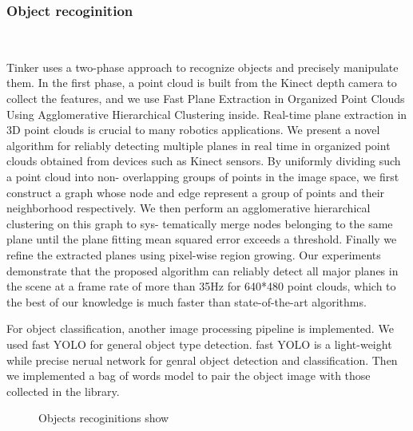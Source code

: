 \subsubsection{Object recoginition}
\ 

Tinker uses a two-phase approach to recognize objects and precisely manipulate them. In the first phase, a point cloud is built from the Kinect depth camera to collect the features, and we use Fast Plane Extraction in Organized Point Clouds Using Agglomerative Hierarchical Clustering inside.
Real-time plane extraction in 3D point clouds
is crucial to many robotics applications. We present a novel
algorithm for reliably detecting multiple planes in real time in
organized point clouds obtained from devices such as Kinect
sensors. By uniformly dividing such a point cloud into non-
overlapping groups of points in the image space, we first
construct a graph whose node and edge represent a group of
points and their neighborhood respectively. We then perform
an agglomerative hierarchical clustering on this graph to sys-
tematically merge nodes belonging to the same plane until the
plane fitting mean squared error exceeds a threshold. Finally
we refine the extracted planes using pixel-wise region growing.
Our experiments demonstrate that the proposed algorithm can
reliably detect all major planes in the scene at a frame rate of
more than 35Hz for 640*480 point clouds, which to the best of
our knowledge is much faster than state-of-the-art algorithms.

For object classification, another image processing pipeline is implemented. We used fast YOLO \cite{1612.08242} for general object type detection. fast YOLO is a light-weight while precise nerual network for genral object detection and classification. Then we implemented a bag of words model \cite{csurka2004visual} to pair the object image with those collected in the library.
\begin{figure} 
	\centering 
	\hspace{0.01\linewidth}
	\vfill
	\caption{Objects recoginitions show}
	\label{fig:subfig}
\end{figure}